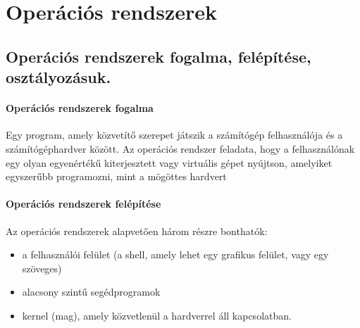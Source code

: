 \section{Operációs rendszerek}
\subsection{Operációs rendszerek fogalma, felépítése, osztályozásuk.}
\paragraph{Operációs rendszerek fogalma}
Egy program, amely közvetítő szerepet játszik a számítógép felhasználója
és a számítógéphardver között.
Az operációs rendszer feladata, hogy a felhasználónak egy olyan egyenértékű kiterjesztett
vagy virtuális gépet nyújtson, amelyiket egyszerűbb programozni, mint a mögöttes hardvert
\paragraph{Operációs rendszerek felépítése}
Az operációs rendszerek alapvetően három részre bonthatók:
	\begin{itemize}
	\item a felhasználói felület (a shell, amely lehet egy grafikus felület, vagy egy szöveges)
	\item alacsony szintű segédprogramok
	\item kernel (mag), amely közvetlenül a hardverrel áll kapcsolatban.
	\end{itemize}
